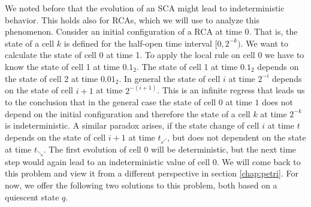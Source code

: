 \documentclass[pre,amssymb,showpacs,showkeys,preprint]{revtex4}
\begin{document}
We noted before that the evolution of an SCA might lead to indeterministic behavior.
This holds also for RCAs, which we will use to analyze this phenomenon.
Consider an initial configuration of a RCA at time 0.
That is, the state of a cell $k$ is defined for the half-open time interval $[0, 2^{-k})$.
We want to calculate the state of cell 0 at time 1.
To apply the local rule on cell 0 we have to know the state of cell 1 at time $0.1_2$.
The state of cell 1 at time $0.1_2$ depends on the state of cell 2 at time $0.01_2$.
In general the state of cell $i$ at time $2^{-i}$ depends on the state of cell $i + 1$ at time $2^{-(i+1)}$.
This is an infinite regress that leads us to the conclusion that in the general case the state of cell 0 at time $1$ does not
depend on the initial configuration and therefore the state of a cell $k$ at time $2^{-k}$ is indeterministic.
A similar paradox arises, if the state change of cell $i$ at time $t$ depends on the state of cell $i + 1$ at time
$t_\swarrow$, but does not dependent on the state at time $t_\searrow$.
The first evolution of cell $0$ will be deterministic, but the next time step would again lead to an indeterministic value of cell $0$.
We will come back to this problem and view it from a different perspective in section \ref{chap:petri}.
For now, we offer the following two solutions to this problem, both based on a quiescent state $q$.
\end{document}
